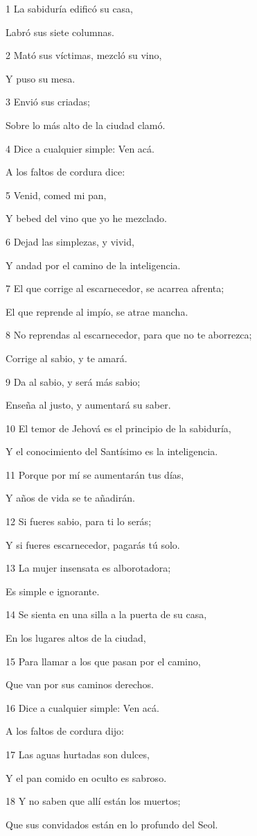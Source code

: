 \par 1 La sabiduría edificó su casa,
\par Labró sus siete columnas.
\par 2 Mató sus víctimas, mezcló su vino,
\par Y puso su mesa.
\par 3 Envió sus criadas;
\par Sobre lo más alto de la ciudad clamó.
\par 4 Dice a cualquier simple: Ven acá.
\par A los faltos de cordura dice:
\par 5 Venid, comed mi pan,
\par Y bebed del vino que yo he mezclado.
\par 6 Dejad las simplezas, y vivid,
\par Y andad por el camino de la inteligencia.
\par 7 El que corrige al escarnecedor, se acarrea afrenta;
\par El que reprende al impío, se atrae mancha.
\par 8 No reprendas al escarnecedor, para que no te aborrezca;
\par Corrige al sabio, y te amará.
\par 9 Da al sabio, y será más sabio;
\par Enseña al justo, y aumentará su saber.
\par 10 El temor de Jehová es el principio de la sabiduría, 
\par Y el conocimiento del Santísimo es la inteligencia.
\par 11 Porque por mí se aumentarán tus días,
\par Y años de vida se te añadirán.
\par 12 Si fueres sabio, para ti lo serás;
\par Y si fueres escarnecedor, pagarás tú solo.
\par 13 La mujer insensata es alborotadora;
\par Es simple e ignorante.
\par 14 Se sienta en una silla a la puerta de su casa,
\par En los lugares altos de la ciudad,
\par 15 Para llamar a los que pasan por el camino,
\par Que van por sus caminos derechos.
\par 16 Dice a cualquier simple: Ven acá.
\par A los faltos de cordura dijo:
\par 17 Las aguas hurtadas son dulces,
\par Y el pan comido en oculto es sabroso.
\par 18 Y no saben que allí están los muertos;
\par Que sus convidados están en lo profundo del Seol.

